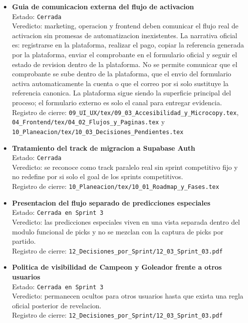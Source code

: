 \begin{itemize}
  \item \textbf{Guia de comunicacion externa del flujo de activacion}\\
  Estado: \texttt{Cerrada}\\
  Veredicto: marketing, operacion y frontend deben comunicar el flujo real de activacion sin promesas de automatizacion inexistentes. La narrativa oficial es: registrarse en la plataforma, realizar el pago, copiar la referencia generada por la plataforma, enviar el comprobante en el formulario oficial y seguir el estado de revision dentro de la plataforma. No se permite comunicar que el comprobante se sube dentro de la plataforma, que el envio del formulario activa automaticamente la cuenta o que el correo por si solo sustituye la referencia canonica. La plataforma sigue siendo la superficie principal del proceso; el formulario externo es solo el canal para entregar evidencia.\\
  Registro de cierre: \texttt{09\_UI\_UX/tex/09\_03\_Accesibilidad\_y\_Microcopy.tex}, \texttt{04\_Frontend/tex/04\_02\_Flujos\_y\_Paginas.tex} y \texttt{10\_Planeacion/tex/10\_03\_Decisiones\_Pendientes.tex}

  \item \textbf{Tratamiento del track de migracion a Supabase Auth}\\
  Estado: \texttt{Cerrada}\\
  Veredicto: se reconoce como track paralelo real sin sprint competitivo fijo y no redefine por si solo el goal de los sprints competitivos.\\
  Registro de cierre: \texttt{10\_Planeacion/tex/10\_01\_Roadmap\_y\_Fases.tex}

  \item \textbf{Presentacion del flujo separado de predicciones especiales}\\
  Estado: \texttt{Cerrada en Sprint 3}\\
  Veredicto: las predicciones especiales viven en una vista separada dentro del modulo funcional de picks y no se mezclan con la captura de picks por partido.\\
  Registro de cierre: \texttt{12\_Decisiones\_por\_Sprint/12\_03\_Sprint\_03.pdf}

  \item \textbf{Politica de visibilidad de Campeon y Goleador frente a otros usuarios}\\
  Estado: \texttt{Cerrada en Sprint 3}\\
  Veredicto: permanecen ocultos para otros usuarios hasta que exista una regla oficial posterior de revelacion.\\
  Registro de cierre: \texttt{12\_Decisiones\_por\_Sprint/12\_03\_Sprint\_03.pdf}


\end{itemize}
